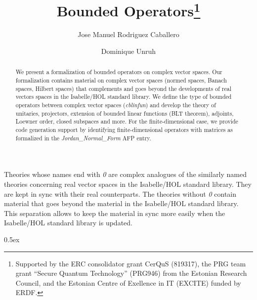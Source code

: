\documentclass[11pt,a4paper]{article}
\begin{document}
\title{Bounded Operators\thanks{Supported by the ERC consolidator grant CerQuS (819317), the PRG team grant “Secure Quantum Technology” (PRG946) from the Estonian Research Council, and the Estonian Centre of Exellence in IT (EXCITE) funded by ERDF.}}
\author[1]{Jose Manuel Rodriguez Caballero}
\author[1]{Dominique Unruh}

\maketitle

\begin{abstract}
  We present a formalization of bounded operators on complex vector spaces.
  Our formalization contains material on complex vector spaces (normed spaces, Banach spaces, Hilbert spaces)
  that complements and goes beyond the developments of real vectors spaces in the Isabelle/HOL standard library.
  We define the type of bounded operators between complex vector spaces (\textit{cblinfun}) and develop the theory of
  unitaries, projectors, extension of bounded linear functions (BLT theorem), adjoints, Loewner order, closed subspaces and more.
  For the finite-dimensional case, we provide code generation support by identifying finite-dimensional operators with matrices
  as formalized in the \textit{Jordan\_Normal\_Form} AFP entry.
\end{abstract}

\tableofcontents

Theories whose names end with \textit{0} are complex analogues of the similarly named theories concerning real vector spaces in the Isabelle/HOL standard library.
They are kept in sync with their real counterparts. The theories without \textit{0} contain material that goes beyond the material in the Isabelle/HOL standard library.
This separation allows to keep the material in sync more easily when the Isabelle/HOL standard library is updated.

\parindent 0pt\parskip 0.5ex





\end{document}
